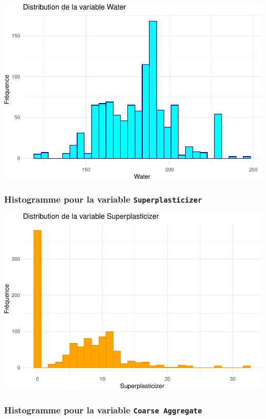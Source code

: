 \documentclass[
  12pt,
]{article}
\begin{document}
\includegraphics{rmd_final_files/figure-latex/unnamed-chunk-43-1.pdf}

\subsubsection{\texorpdfstring{Histogramme pour la variable
\texttt{Superplasticizer}}{Histogramme pour la variable Superplasticizer}}\label{histogramme-pour-la-variable-superplasticizer}

\includegraphics{rmd_final_files/figure-latex/unnamed-chunk-44-1.pdf}

\subsubsection{\texorpdfstring{Histogramme pour la variable
\texttt{Coarse\ Aggregate}}{Histogramme pour la variable Coarse Aggregate}}\label{histogramme-pour-la-variable-coarse-aggregate}
\end{document}
